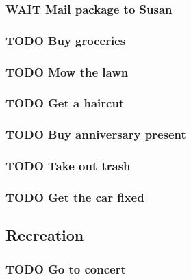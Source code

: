 \documentclass[11pt]{article}
\begin{document}
\subsubsection*{WAIT Mail package to Susan}
\label{sec:org9fd48ad}

\subsubsection*{{\bfseries\sffamily TODO} Buy groceries}
\label{sec:org5d52484}

\subsubsection*{{\bfseries\sffamily TODO} Mow the lawn}
\label{sec:org2fc09cb}

\subsubsection*{{\bfseries\sffamily TODO} Get a haircut}
\label{sec:org7e0c6bc}

\subsubsection*{{\bfseries\sffamily TODO} Buy anniversary present}
\label{sec:org11fa685}

\subsubsection*{{\bfseries\sffamily TODO} Take out trash}
\label{sec:orgf7fcb12}

\subsubsection*{{\bfseries\sffamily TODO} Get the car fixed}
\label{sec:org847189e}

\subsection{Recreation}
\label{sec:org6f959f0}

\subsubsection*{{\bfseries\sffamily TODO} Go to concert}
\label{sec:orgf69b94a}
\end{document}
